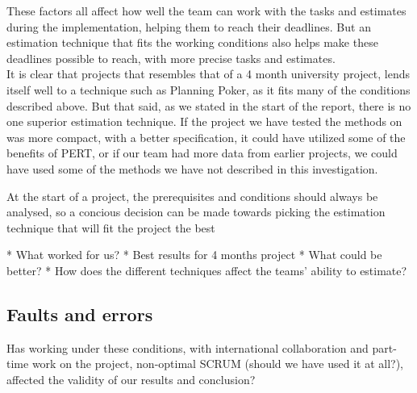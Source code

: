 These factors all affect how well the team can work with the tasks and estimates during the implementation, helping them to reach their deadlines. But an estimation technique that fits the working conditions also helps make these deadlines possible to reach, with more precise tasks and estimates.\\

It is clear that projects that resembles that of a 4 month university project, lends itself well to a technique such as Planning Poker, as it fits many of the conditions described above. But that said, as we stated in the start of the report, there is no one superior estimation technique. If the project we have tested the methods on was more compact, with a better specification, it could have utilized some of the benefits of PERT, or if our team had more data from earlier projects, we could have used some of the methods we have not described in this investigation. 

At the start of a project, the prerequisites and conditions should always be analysed, so a concious decision can be made towards picking the estimation technique that will fit the project the best


* What worked for us?
* Best results for 4 months project
* What could be better?
* How does the different techniques affect the teams' ability to estimate?

\subsection{Faults and errors}
Has working under these conditions, with international collaboration and part-time work on the project, non-optimal SCRUM (should we have used it at all?), affected the validity of our results and conclusion?
